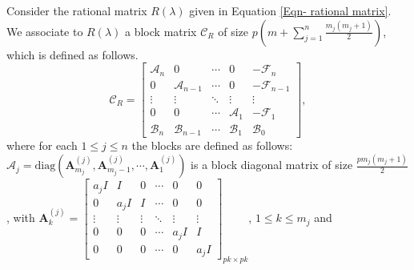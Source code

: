 \documentclass[12pt, reqno]{amsart}
\theoremstyle{definition}
\theoremstyle{remark}
\numberwithin{equation}{section}
\begin{document}
Consider the rational matrix $R(\lambda)$ given in Equation 
\eqref{Eqn- rational matrix}. We associate to $R(\lambda)$ a block 
matrix $\mathcal{C}_R$ of size $p\left(m + \displaystyle \sum_{j=1}^{n}
\frac{m_j(m_j+1)}{2}\right)$, which is defined as follows.
\begin{equation}\label{Eqn-Block matrix}
\mathcal{C}_R= \begin{bmatrix}
\mathcal{A}_n & 0 & \cdots & 0 & -\mathcal{F}_n \\
0 & \mathcal{A}_{n-1} & \cdots & 0 & -\mathcal{F}_{n-1} \\
\vdots & \vdots & \ddots & \vdots & \vdots \\
0 & 0 & \cdots & \mathcal{A}_1 & -\mathcal{F}_1 \\
\mathcal{B}_n & \mathcal{B}_{n-1} & \cdots & \mathcal{B}_1 & \mathcal{B}_0
\end{bmatrix},
\end{equation}
where for each $1 \leq j \leq n$ the blocks are defined as follows: \\
$\mathcal{A}_j = \text{diag}(\textbf{A}_{m_j}^{(j)},\textbf{A}_{m_j-1}^{(j)},
\cdots,\textbf{A}_1^{(j)})$ is a block diagonal matrix of size $ \displaystyle 
\frac{pm_j(m_j+1)}{2}$, with $\textbf{A}_k^{(j)} 
=\begin{bmatrix}
a_jI & I & 0 & \cdots & 0 & 0 \\
0 & a_jI & I & \cdots & 0 & 0 \\
\vdots & \vdots & \vdots & \ddots & \vdots & \vdots \\
0 & 0 & 0 & \cdots & a_jI & I \\
0 & 0 & 0 & \cdots & 0 & a_jI
\end{bmatrix}_{pk \times pk}$, $1\leq k \leq m_j$ and 
\end{document}
